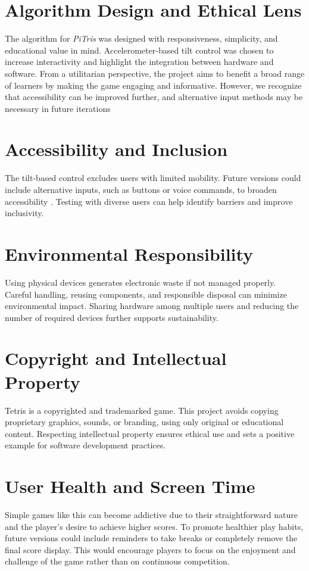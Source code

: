 \documentclass[12pt]{report}
\begin{document}
\section{Algorithm Design and Ethical Lens}
The algorithm for \textit{PiTris} was designed with responsiveness, simplicity, and educational value in mind. Accelerometer-based tilt control was chosen to increase interactivity and highlight the integration between hardware and software. From a utilitarian perspective, the project aims to benefit a broad range of learners by making the game engaging and informative. However, we recognize that accessibility can be improved further, and alternative input methods may be necessary in future iterations

\section{Accessibility and Inclusion}
The tilt-based control excludes users with limited mobility. Future versions could include alternative inputs, such as buttons or voice commands, to broaden accessibility \cite{Seale2014}. Testing with diverse users can help identify barriers and improve inclusivity.



\section{Environmental Responsibility}
Using physical devices generates electronic waste if not managed properly. Careful handling, reusing components, and responsible disposal can minimize environmental impact. Sharing hardware among multiple users and reducing the number of required devices further supports sustainability.

\section{Copyright and Intellectual Property}
Tetris is a copyrighted and trademarked game. This project avoids copying proprietary graphics, sounds, or branding, using only original or educational content. Respecting intellectual property ensures ethical use and sets a positive example for software development practices.

\section{User Health and Screen Time}
Simple games like this can become addictive due to their straightforward nature
and the player's desire to achieve higher scores. To promote healthier play
habits, future versions could include reminders to take breaks or completely remove the
final score display. This would encourage players to focus on the
enjoyment and challenge of the game rather than on continuous competition.
\end{document}
